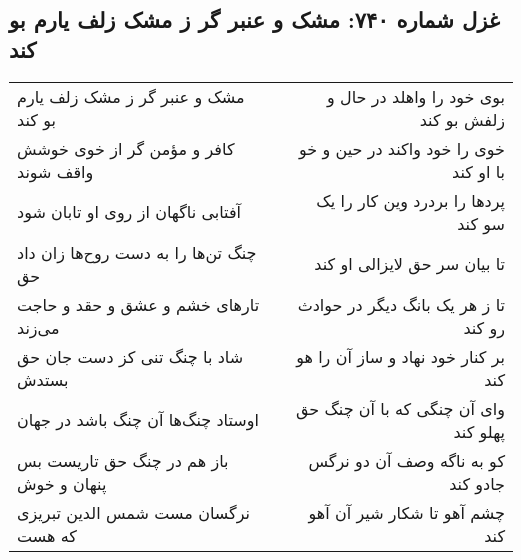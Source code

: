 \begin{center}
\section*{غزل شماره ۷۴۰: مشک و عنبر گر ز مشک زلف یارم بو کند}
\label{sec:0740}
\begin{longtable}{l p{0.5cm} r}
مشک و عنبر گر ز مشک زلف یارم بو کند
&&
بوی خود را واهلد در حال و زلفش بو کند
\\
کافر و مؤمن گر از خوی خوشش واقف شوند
&&
خوی را خود واکند در حین و خو با او کند
\\
آفتابی ناگهان از روی او تابان شود
&&
پردها را بردرد وین کار را یک سو کند
\\
چنگ تن‌ها را به دست روح‌ها زان داد حق
&&
تا بیان سر حق لایزالی او کند
\\
تارهای خشم و عشق و حقد و حاجت می‌زند
&&
تا ز هر یک بانگ دیگر در حوادث رو کند
\\
شاد با چنگ تنی کز دست جان حق بستدش
&&
بر کنار خود نهاد و ساز آن را هو کند
\\
اوستاد چنگ‌ها آن چنگ باشد در جهان
&&
وای آن چنگی که با آن چنگ حق پهلو کند
\\
باز هم در چنگ حق تاریست بس پنهان و خوش
&&
کو به ناگه وصف آن دو نرگس جادو کند
\\
نرگسان مست شمس الدین تبریزی که هست
&&
چشم آهو تا شکار شیر آن آهو کند
\\
\end{longtable}
\end{center}
